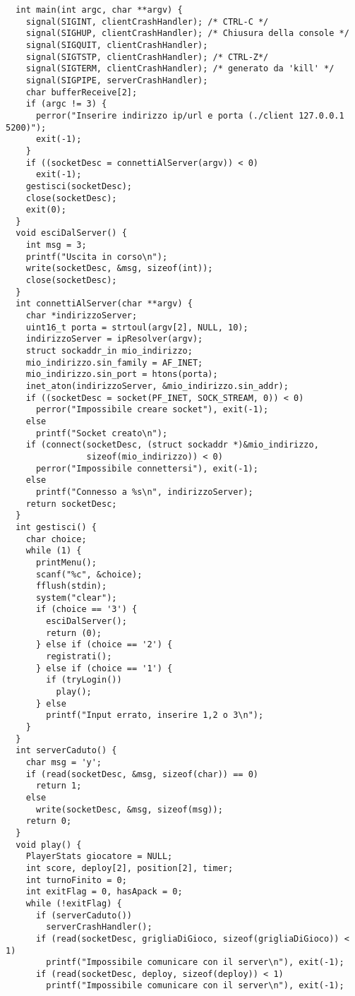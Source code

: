 \begin{lstlisting}
  int main(int argc, char **argv) {
    signal(SIGINT, clientCrashHandler); /* CTRL-C */
    signal(SIGHUP, clientCrashHandler); /* Chiusura della console */
    signal(SIGQUIT, clientCrashHandler);
    signal(SIGTSTP, clientCrashHandler); /* CTRL-Z*/
    signal(SIGTERM, clientCrashHandler); /* generato da 'kill' */
    signal(SIGPIPE, serverCrashHandler);
    char bufferReceive[2];
    if (argc != 3) {
      perror("Inserire indirizzo ip/url e porta (./client 127.0.0.1 5200)");
      exit(-1);
    }
    if ((socketDesc = connettiAlServer(argv)) < 0)
      exit(-1);
    gestisci(socketDesc);
    close(socketDesc);
    exit(0);
  }
  void esciDalServer() {
    int msg = 3;
    printf("Uscita in corso\n");
    write(socketDesc, &msg, sizeof(int));
    close(socketDesc);
  }
  int connettiAlServer(char **argv) {
    char *indirizzoServer;
    uint16_t porta = strtoul(argv[2], NULL, 10);
    indirizzoServer = ipResolver(argv);
    struct sockaddr_in mio_indirizzo;
    mio_indirizzo.sin_family = AF_INET;
    mio_indirizzo.sin_port = htons(porta);
    inet_aton(indirizzoServer, &mio_indirizzo.sin_addr);
    if ((socketDesc = socket(PF_INET, SOCK_STREAM, 0)) < 0)
      perror("Impossibile creare socket"), exit(-1);
    else
      printf("Socket creato\n");
    if (connect(socketDesc, (struct sockaddr *)&mio_indirizzo,
                sizeof(mio_indirizzo)) < 0)
      perror("Impossibile connettersi"), exit(-1);
    else
      printf("Connesso a %s\n", indirizzoServer);
    return socketDesc;
  }
  int gestisci() {
    char choice;
    while (1) {
      printMenu();
      scanf("%c", &choice);
      fflush(stdin);
      system("clear");
      if (choice == '3') {
        esciDalServer();
        return (0);
      } else if (choice == '2') {
        registrati();
      } else if (choice == '1') {
        if (tryLogin())
          play();
      } else
        printf("Input errato, inserire 1,2 o 3\n");
    }
  }
  int serverCaduto() {
    char msg = 'y';
    if (read(socketDesc, &msg, sizeof(char)) == 0)
      return 1;
    else
      write(socketDesc, &msg, sizeof(msg));
    return 0;
  }
  void play() {
    PlayerStats giocatore = NULL;
    int score, deploy[2], position[2], timer;
    int turnoFinito = 0;
    int exitFlag = 0, hasApack = 0;
    while (!exitFlag) {
      if (serverCaduto())
        serverCrashHandler();
      if (read(socketDesc, grigliaDiGioco, sizeof(grigliaDiGioco)) < 1)
        printf("Impossibile comunicare con il server\n"), exit(-1);
      if (read(socketDesc, deploy, sizeof(deploy)) < 1)
        printf("Impossibile comunicare con il server\n"), exit(-1);

\end{lstlisting}
